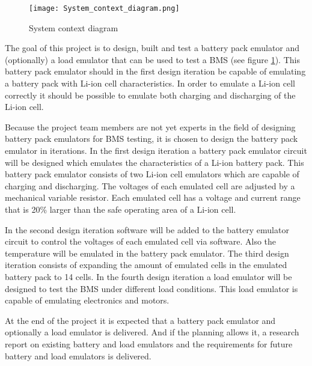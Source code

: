 \begin{figure}[ht]
    \centering
    \texttt{[image: System\_context\_diagram.png]}
    \caption{System context diagram}
    \label{fig:system_context_diagram}
\end{figure}

The goal of this project is to design, built and test a battery pack emulator and (optionally) a load emulator that can be used to test a BMS (see figure \ref{fig:system_context_diagram}). This battery pack emulator should in the first design iteration be capable of emulating a battery pack with Li-ion cell characteristics. In order to emulate a Li-ion cell correctly it should be possible to emulate both charging and discharging of the Li-ion cell. 

Because the project team members are not yet experts in the field of designing battery pack emulators for BMS testing, it is chosen to design the battery pack emulator in iterations. In the first design iteration a battery pack emulator circuit will be designed which emulates the characteristics of a Li-ion battery pack. This battery pack emulator consists of two Li-ion cell emulators which are capable of charging and discharging. The voltages of each emulated cell are adjusted by a mechanical variable resistor. Each emulated cell has a voltage and current range that is 20\% larger than the safe operating area of a Li-ion cell.

In the second design iteration software will be added to the battery emulator circuit to control the voltages of each emulated cell via software. Also the temperature will be emulated in the battery pack emulator. The third design iteration consists of expanding the amount of emulated cells in the emulated battery pack to 14 cells. In the fourth design iteration a load emulator will be designed to test the BMS under different load conditions. This load emulator is capable of emulating electronics and motors. 


At the end of the project it is expected that a battery pack emulator and optionally a load emulator is delivered. And if the planning allows it, a research report on existing battery and load emulators and the requirements for future battery and load emulators is delivered.

